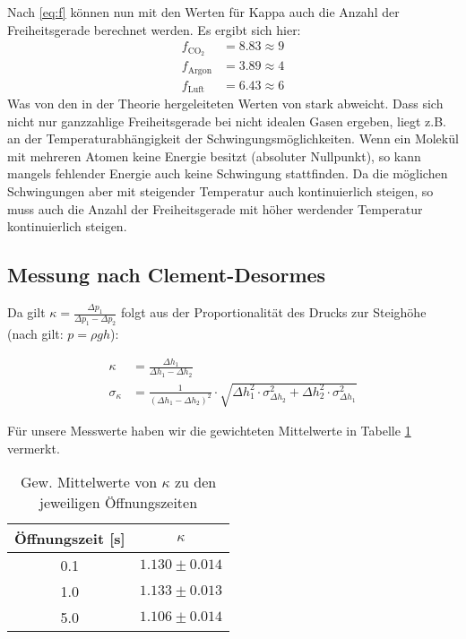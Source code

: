 \documentclass[12pt,a4paper,titlepage,headinclude,bibtotoc]{scrartcl}
\begin{document}
Nach \eqref{eq:f} %
können nun mit den Werten für Kappa auch die Anzahl der Freiheitsgerade berechnet werden. Es ergibt sich hier:
\begin{align*}
	f_{\text{CO}_2}&= 8.83\approx 9\\
	f_\text{Argon} &= 3.89\approx 4 \\
	f_\text{Luft}  &=6.43\approx 6
\end{align*}
Was von den in der Theorie hergeleiteten Werten von %
stark abweicht.
Dass sich nicht nur ganzzahlige Freiheitsgerade bei nicht idealen Gasen ergeben, liegt z.B. an der Temperaturabhängigkeit der Schwingungsmöglichkeiten.
Wenn ein Molekül mit mehreren Atomen keine Energie besitzt (absoluter Nullpunkt), so kann mangels fehlender Energie auch keine Schwingung stattfinden.
Da die möglichen Schwingungen aber mit steigender Temperatur auch kontinuierlich steigen, so muss auch die Anzahl der Freiheitsgerade mit höher werdender Temperatur kontinuierlich steigen.

\subsection{Messung nach Clement-Desormes}

Da gilt $\kappa=\frac{\Delta p_1}{\Delta p_1-\Delta p_2}$ folgt aus der Proportionalität des Drucks zur Steighöhe (nach \cite[S. 457]{giancoli} gilt: $p=\rho g h$):

\begin{align*}
	\kappa&=\frac{\Delta h_{1}}{\Delta h_{1} - \Delta h_{2}}\\
	\sigma_{\kappa}&=\frac{1}{\left(\Delta h_{1} - \Delta h_{2}\right)^{2}} \cdot \sqrt{\Delta h_{1}^{2} \cdot \sigma_{\Delta h_2}^{2} + \Delta h_{2}^{2} \cdot \sigma_{\Delta h_1}^{2}}
\end{align*}

Für unsere Messwerte haben wir die gewichteten Mittelwerte in Tabelle \ref{tab:kappaclement} vermerkt.

\begin{table}[!htb]
	\centering
	\begin{tabular}{|c|c|}
		\hline
		Öffnungszeit [s] & $\kappa$\\\hline
		0.1 & $1.130 \pm 0.014$\\
		1.0 & $1.133 \pm 0.013$\\
		5.0 & $1.106 \pm 0.014$\\
		\hline
	\end{tabular}
	\caption{Gew. Mittelwerte von $\kappa$ zu den jeweiligen Öffnungszeiten}
	\label{tab:kappaclement}
\end{table}
\end{document}
